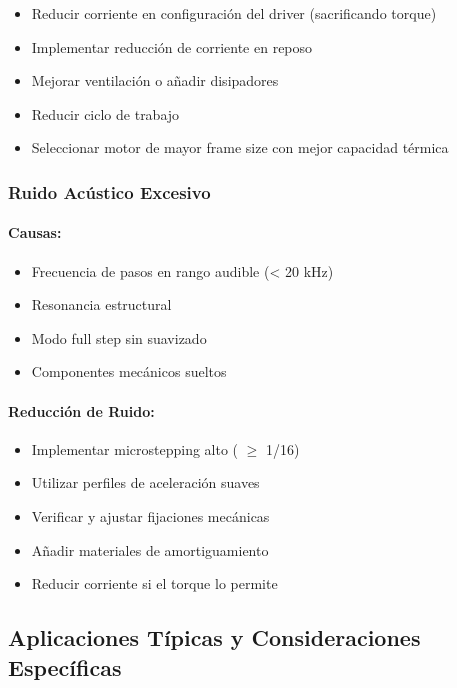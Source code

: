 \begin{itemize}
    \item Reducir corriente en configuración del driver (sacrificando torque)
    \item Implementar reducción de corriente en reposo
    \item Mejorar ventilación o añadir disipadores
    \item Reducir ciclo de trabajo
    \item Seleccionar motor de mayor frame size con mejor capacidad térmica
\end{itemize}

\subsubsection{Ruido Acústico Excesivo}

\paragraph{Causas:}

\begin{itemize}
    \item Frecuencia de pasos en rango audible (< 20 kHz)
    \item Resonancia estructural
    \item Modo full step sin suavizado
    \item Componentes mecánicos sueltos
\end{itemize}

\paragraph{Reducción de Ruido:}

\begin{itemize}
    \item Implementar microstepping alto ( $\geq$ 1/16)
    \item Utilizar perfiles de aceleración suaves
    \item Verificar y ajustar fijaciones mecánicas
    \item Añadir materiales de amortiguamiento
    \item Reducir corriente si el torque lo permite
\end{itemize}

\subsection{Aplicaciones Típicas y Consideraciones Específicas}

